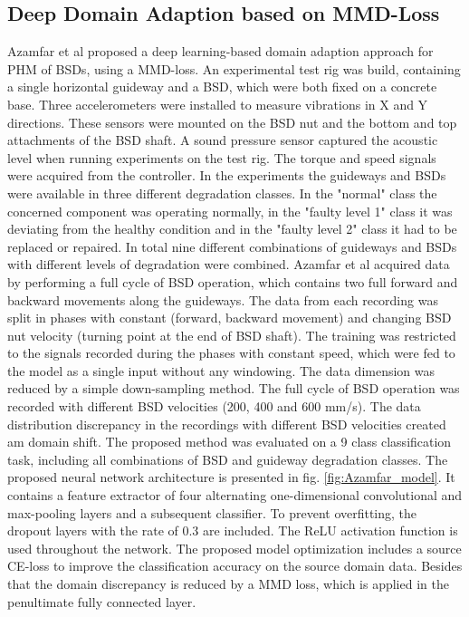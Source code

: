\subsection{Deep Domain Adaption based on MMD-Loss}
Azamfar et al \cite{AZAMFAR2020103932} proposed a deep learning-based domain adaption approach for PHM of BSDs, using a MMD-loss. An experimental test rig was build, containing a single horizontal guideway and a BSD, which were both fixed on a concrete base. Three accelerometers were installed to measure vibrations in X and Y directions. These sensors were mounted on the BSD nut and the bottom and top attachments of the BSD shaft. A sound pressure sensor captured the acoustic level when running experiments on the test rig. The torque and speed signals were acquired from the controller. In the experiments the guideways and BSDs were available in three different degradation classes. In the "normal" class the concerned component was operating normally, in the "faulty level 1" class it was deviating from the healthy condition and in the "faulty level 2" class it had to be replaced or repaired. In total nine different combinations of guideways and BSDs with different levels of degradation were combined. Azamfar et al acquired data by performing a full cycle of BSD operation, which contains two full forward and backward movements along the guideways. The data from each recording was split in phases with constant (forward, backward movement) and changing BSD nut velocity (turning point at the end of BSD shaft). The training was restricted to the signals recorded during the phases with constant speed, which were fed to the model as a single input without any windowing. The data dimension was reduced by a simple down-sampling method. The full cycle of BSD operation was recorded with different BSD velocities (200, 400 and 600 mm/s). The data distribution discrepancy in the recordings with different BSD velocities created am domain shift. The proposed method was evaluated on a 9 class classification task, including all combinations of BSD and guideway degradation classes. The proposed neural network architecture is presented in fig. \ref{fig:Azamfar_model}. It contains a feature extractor of four alternating one-dimensional convolutional and max-pooling layers and a subsequent classifier. To prevent overfitting, the dropout layers with the rate of 0.3 are included. The ReLU activation function is used throughout the network. The proposed model optimization includes a source CE-loss to improve the classification accuracy on the source domain data. Besides that the domain discrepancy is reduced by a MMD loss, which is applied in the penultimate fully connected layer. 

